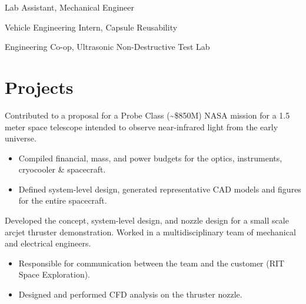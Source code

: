 \documentclass[10pt,final,sans]{resume}
\begin{document}
Lab Assistant, Mechanical Engineer

Vehicle Engineering Intern, Capsule Reusability

Engineering Co-op, Ultrasonic Non-Destructive Test Lab


\section{Projects}
Contributed to a proposal for a Probe Class (\textasciitilde\$850M) NASA mission for a 1.5
meter space telescope intended to observe near-infrared light from the early
universe.
\begin{itemize}
  \item Compiled financial, mass, and power budgets for the optics, instruments,
    cryocooler \& spacecraft.
  \item Defined system-level design, generated representative CAD models and
    figures for the entire spacecraft.
\end{itemize}

Developed the concept, system-level design, and nozzle design for a small scale
arcjet thruster demonstration. Worked in a multidisciplinary team of mechanical and electrical engineers.
\begin{itemize}
  \item Responsible for communication between the team and the customer (RIT Space Exploration).
  \item Designed and performed CFD analysis on the thruster nozzle.
\end{itemize}
\end{document}
